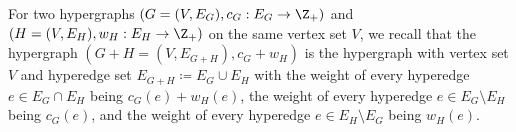 For two hypergraphs $(G=(V, E_G), c_G:E_G\rightarrow \Z_+)$ and $(H=(V, E_H), w_H: E_H\rightarrow \Z_+)$ on the same vertex set $V$, we recall that the hypergraph $(G+H=(V, E_{G+H}), c_G+w_H)$ is the hypergraph with vertex set $V$ and hyperedge set $E_{G+H}\coloneqq E_G\cup E_H$ with the weight of every hyperedge $e\in E_G\cap E_H$ being $c_G(e) + w_H(e)$, the weight of every hyperedge $e\in E_G\setminus E_H$ being $c_G(e)$,  and the weight of every hyperedge $e\in E_H\setminus E_G$ being $w_H(e)$. 